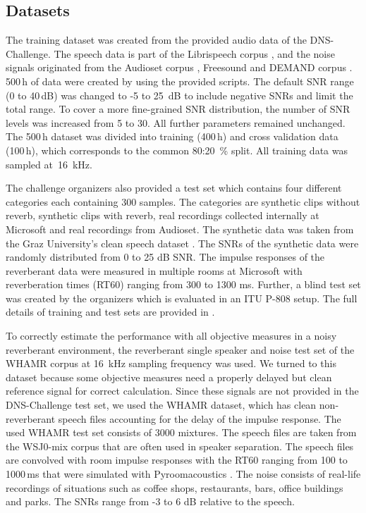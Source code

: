 \documentclass[a4paper]{article}
\begin{document}
\subsection{Datasets}
The training dataset was created from the provided audio data of the DNS-Challenge. The speech data is part of the Librispeech corpus \cite{panayotov2015librispeech}, and the noise signals originated from the Audioset corpus \cite{gemmeke2017audio}, Freesound and DEMAND corpus \cite{thiemann2013diverse}. 
500\,h of data were created by using the provided scripts. 
The default SNR range (0 to 40\,dB) was changed to -5 to 25~dB to include negative SNRs  and limit the total range. To cover a more fine-grained SNR distribution, the number of SNR levels was increased from 5 to 30. All further parameters remained unchanged. 
The 500\,h dataset was divided into training (400\,h) and cross validation data (100\,h), which corresponds to the common 80:20~\% split. 
All training data was sampled at~16~kHz.

The challenge organizers also provided a test set which contains four different categories each containing 300 samples. The categories are synthetic clips without reverb, synthetic clips with reverb, real recordings collected internally at Microsoft and real recordings from Audioset. 
The synthetic data was taken from the Graz University’s clean speech dataset \cite{pirker2011pitch}.
The SNRs of the synthetic data were randomly distributed from 0 to 25 dB SNR. 
The impulse responses of the reverberant data were measured in multiple rooms at Microsoft with reverberation times (RT60) ranging from 300 to 1300 ms. 
Further, a blind test set was created by the organizers which is evaluated in an ITU P-808 \cite{recommendation2018itu} setup. 
The full details of training and test sets are provided in \cite{DNSChallenge2020}.

To correctly estimate the performance with all objective measures in a noisy reverberant environment, the reverberant single speaker and noise test set of the WHAMR corpus \cite{maciejewski2020whamr} at 16~kHz sampling frequency was used. 
We turned to this dataset because some objective measures need a properly delayed but clean reference signal for correct calculation. 
Since these signals are not provided in the DNS-Challenge test set, we used the WHAMR dataset, which has clean non-reverberant speech files accounting for the delay of the impulse response.
The used WHAMR test set consists of 3000 mixtures. The speech files are taken from the WSJ0-mix corpus \cite{Hershey2016mar} that are often used in speaker separation. 
The speech files are convolved with room impulse responses with the RT60 ranging from 100 to 1000\,ms that were simulated with Pyroomacoustics \cite{scheibler2018pyroomacoustics}. 
The noise consists of real-life recordings of situations such as coffee shops, restaurants, bars, office buildings and parks. The SNRs range from -3 to 6 dB relative to the speech.
\end{document}
